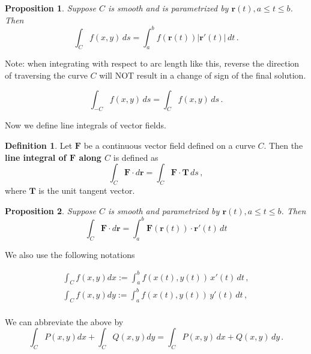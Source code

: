 \documentclass[
]{book}
\newtheorem{proposition}{Proposition}[chapter]
\theoremstyle{definition}
\newtheorem{definition}{Definition}[chapter]
\theoremstyle{definition}
\theoremstyle{definition}
\theoremstyle{definition}
\theoremstyle{remark}
\begin{document}
\begin{proposition}
Suppose \(C\) is smooth and is parametrized by \(\mathbf{r}(t), a\leq t \leq b\). Then
\begin{equation*}
    \int_C f(x,y) \, ds = \int_a^b f(\mathbf{r}(t)) |\mathbf{r}'(t)| \, dt \,.
\end{equation*}
\end{proposition}

Note: when integrating with respect to arc length like this, reverse the direction of traversing the curve \(C\) will NOT result
in a change of sign of the final solution.

\begin{equation*}
    \int_{-C} f(x,y) \, ds =  \int_C f(x,y) \, ds \,.
\end{equation*}

Now we define line integrals of vector fields.

\begin{definition}
Let \(\mathbf{F}\) be a continuous vector field defined
on a curve \(C\).
Then the \textbf{line integral of \(\mathbf{F}\) along \(C\)} is defined as
\begin{equation*}
    \int_C \mathbf{F} \cdot d \mathbf{r} 
    = \int_C \mathbf{F}\cdot \mathbf{T} \, ds \,,
\end{equation*}
where \(\mathbf{T}\) is the unit tangent vector.
\end{definition}

\begin{proposition}
Suppose \(C\) is smooth and
parametrized by \(\mathbf{r}(t), a \leq t \leq b\).
Then
\begin{equation*}
    \int_C \mathbf{F} \cdot d \mathbf{r} 
    = \int_a^b \mathbf{F}(\mathbf{r}(t)) \cdot \mathbf{r}'(t) \, dt
\end{equation*}
\end{proposition}

We also use the following notations

\begin{align*}
\int_C f(x,y) dx := \int_a^b f(x(t), y(t) ) \, x'(t) \, dt \,, \\
\int_C f(x,y) dy := \int_a^b f(x(t), y(t) ) \, y'(t) \, dt \,, \\
\end{align*}

We can abbreviate the above by
\begin{equation*}
\int_C P(x,y) dx +
\int_C Q(x,y) dy 
= \int_C P(x,y) \, dx + Q(x,y) \, dy \,.
\end{equation*}
\end{document}
